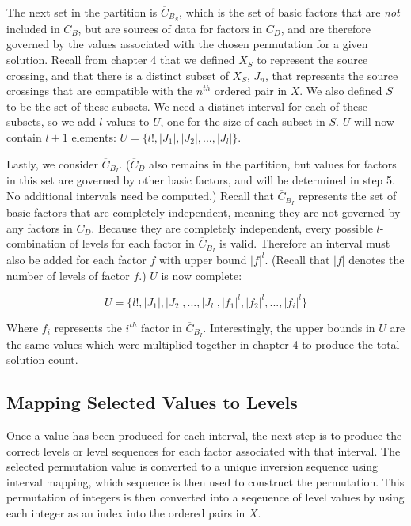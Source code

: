 The next set in the partition is $\overline{C}_{B_S}$, which is the set of basic factors that are \textit{not} included in $C_B$, but are sources of data for factors in $C_D$, and are therefore governed by the values associated with the chosen permutation for a given solution. Recall from chapter 4 that we defined $X_S$ to represent the source crossing, and that there is a distinct subset of $X_S$, $J_n$, that represents the source crossings that are compatible with the $n^{th}$ ordered pair in $X$. We also defined $S$ to be the set of these subsets. We need a distinct interval for each of these subsets, so we add $l$ values to $U$, one for the size of each subset in $S$. $U$ will now contain $l + 1$ elements: $U = \{l!, |J_1|, |J_2|, ..., |J_l|\}$.

Lastly, we consider $\overline{C}_{B_I}$. ($\overline{C}_D$ also remains in the partition, but values for factors in this set are governed by other basic factors, and will be determined in step 5. No additional intervals need be computed.) Recall that $\overline{C}_{B_I}$ represents the set of basic factors that are completely independent, meaning they are not governed by any factors in $C_D$. Because they are completely independent, every possible $l$-combination of levels for each factor in $\overline{C}_{B_I}$ is valid. Therefore an interval must also be added for each factor $f$ with upper bound $|f|^l$. (Recall that $|f|$ denotes the number of levels of factor $f$.) $U$ is now complete:

\[
U = \{ l!, |J_1|, |J_2|, ..., |J_l|, |f_1|^l, |f_2|^l, ..., |f_i|^l\}
\]

Where $f_i$ represents the $i^{th}$ factor in $\overline{C}_{B_I}$. Interestingly, the upper bounds in $U$ are the same values which were multiplied together in chapter 4 to produce the total solution count.

\subsection{Mapping Selected Values to Levels}

Once a value has been produced for each interval, the next step is to produce the correct levels or level sequences for each factor associated with that interval. The selected permutation value is converted to a unique inversion sequence using interval mapping, which sequence is then used to construct the permutation. This permutation of integers is then converted into a seqeuence of level values by using each integer as an index into the ordered pairs in $X$.

